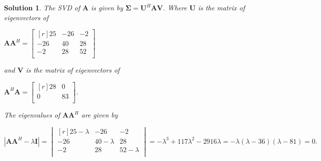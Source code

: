 \documentclass{article}
\newtheorem*{solution}{Solution}
\begin{document}
\begin{solution}
    The SVD of $\mathbf{A}$ is given by $\mathbf{\Sigma} = \mathbf{U}^{H}\mathbf{A}\mathbf{V}$.
    Where $\mathbf{U}$ is the matrix of eigenvectors of 

    \begin{center}
        \begin{math}
            \mathbf{A}\mathbf{A}^{H}= 
                \begin{bmatrix*}[r]
                        25 & -26 & -2 \\
                        -26 & 40 & 28 \\
                        -2 & 28 & 52 \\ 
                \end{bmatrix*}
        \end{math}
    \end{center}

    and $\mathbf{V}$ is the matrix of eigenvectors of

    \begin{center}
        \begin{math}
            \mathbf{A}^{H}\mathbf{A}= 
                \begin{bmatrix*}[r]
                        28 & 0 \\
                        0 & 83 \\
                \end{bmatrix*}
        \end{math}.
    \end{center}

    The eigenvalues of $\mathbf{A}\mathbf{A}^{H}$ are given by

    \begin{center}
        \begin{math}
            \left\lvert \mathbf{A}\mathbf{A}^{H} - \lambda\mathbf{I} \right\rvert = 
                \begin{vmatrix*}[r]
                        25-\lambda & -26 & -2 \\
                        -26 & 40-\lambda & 28 \\
                        -2 & 28 & 52-\lambda \\ 
                \end{vmatrix*}
                = -\lambda^{3}+117\lambda^{2}-2916\lambda = -\lambda(\lambda - 36)(\lambda - 81)= 0.
        \end{math}
    \end{center}


\end{solution}
\end{document}
